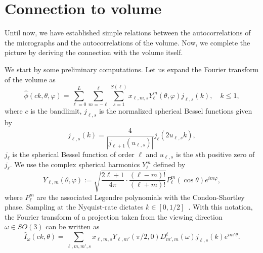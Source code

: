 \documentclass[english,11pt]{article}
\newcommand{\1}{\mathbf{1}}
\newcommand{\kk}{\textbf{k}}
\newcommand{\TODO}[1]{{\color{red}{[#1]}}}
\numberwithin{equation}{section}
\theoremstyle{plain}
\theoremstyle{definition}
\theoremstyle{remark}
\theoremstyle{plain}
\theoremstyle{remark}
\theoremstyle{plain}
\theoremstyle{plain}
\newcommand{\tamir}{x}
\begin{document}
\section{Connection to volume}

Until now, we have established  simple relations between the autocorrelations of the micrographs and the autocorrelations of the volume. Now, we complete the picture by deriving the connection with the volume itself.

We start by some preliminary computations. Let us  expand the Fourier transform of the volume as
\begin{equation} \label{eq:volume_expansion_app} 
\widehat \phi(ck, \theta, \varphi) = \sum_{\ell = 0}^L\sum_{m=-\ell}^{\ell}\sum_{s=1}^{S(\ell)}\tamir_{\ell, m, s}Y_{\ell}^m(\theta,\varphi)j_{\ell,s}(k), \quad k\leq 1,
\end{equation}
\TODO{How do we choose $S(\ell)$?}where $c$ is the bandlimit, $j_{\ell,s}$ is the normalized spherical Bessel functions given by
\[ j_{\ell, s}(k) = \frac{4}{|j_{\ell+1}(u_{\ell, s})|}j_{\ell}(2u_{\ell,s} k),\]
$j_{\ell}$ is the spherical Bessel function of order $\ell$ and  $u_{\ell,s}$ is the $s$th positive zero of $j_{\ell}$. We use 
the complex spherical harmonics $Y_{\ell}^m$ defined by  
\[ Y_{\ell,m}(\theta,\varphi) := \sqrt{\frac{2\ell+1}{4\pi}\cdot\frac{(\ell-m)!}{(\ell+m)!}}P_{\ell}^m(\cos\theta)e^{i m\varphi},\]
where $P_{\ell}^m$ are the associated Legendre polynomials with the Condon-Shortley phase. 
Sampling at the Nyquist-rate dictates $k\in[0,1/2]$~\cite{levin20173d}. \TODO{Didn't we say that $k\leq 1$?} With this notation, 
the Fourier transform of a  projection taken from the viewing direction $\omega\in SO(3)$ can be written as 
\[ \widehat I_{\omega}(ck,\theta) = \sum_{\ell,m,m',s}\tamir_{\ell,m,s}Y_{\ell,m'}(\pi/2,0)D_{m',m}^{\ell}(\omega)j_{\ell,s}(k)e^{im'\theta}.\]
\end{document}
